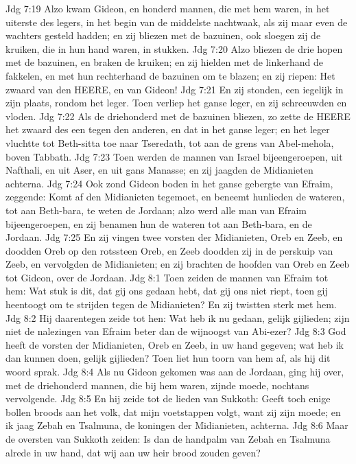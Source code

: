 Jdg 7:19  Alzo kwam Gideon, en honderd mannen, die met hem waren, in het uiterste des legers, in het begin van de middelste nachtwaak, als zij maar even de wachters gesteld hadden; en zij bliezen met de bazuinen, ook sloegen zij de kruiken, die in hun hand waren, in stukken.
Jdg 7:20  Alzo bliezen de drie hopen met de bazuinen, en braken de kruiken; en zij hielden met de linkerhand de fakkelen, en met hun rechterhand de bazuinen om te blazen; en zij riepen: Het zwaard van den HEERE, en van Gideon!
Jdg 7:21  En zij stonden, een iegelijk in zijn plaats, rondom het leger. Toen verliep het ganse leger, en zij schreeuwden en vloden.
Jdg 7:22  Als de driehonderd met de bazuinen bliezen, zo zette de HEERE het zwaard des een tegen den anderen, en dat in het ganse leger; en het leger vluchtte tot Beth-sitta toe naar Tseredath, tot aan de grens van Abel-mehola, boven Tabbath.
Jdg 7:23  Toen werden de mannen van Israel bijeengeroepen, uit Nafthali, en uit Aser, en uit gans Manasse; en zij jaagden de Midianieten achterna.
Jdg 7:24  Ook zond Gideon boden in het ganse gebergte van Efraim, zeggende: Komt af den Midianieten tegemoet, en beneemt hunlieden de wateren, tot aan Beth-bara, te weten de Jordaan; alzo werd alle man van Efraim bijeengeroepen, en zij benamen hun de wateren tot aan Beth-bara, en de Jordaan.
Jdg 7:25  En zij vingen twee vorsten der Midianieten, Oreb en Zeeb, en doodden Oreb op den rotssteen Oreb, en Zeeb doodden zij in de perskuip van Zeeb, en vervolgden de Midianieten; en zij brachten de hoofden van Oreb en Zeeb tot Gideon, over de Jordaan.
Jdg 8:1  Toen zeiden de mannen van Efraim tot hem: Wat stuk is dit, dat gij ons gedaan hebt, dat gij ons niet riept, toen gij heentoogt om te strijden tegen de Midianieten? En zij twistten sterk met hem.
Jdg 8:2  Hij daarentegen zeide tot hen: Wat heb ik nu gedaan, gelijk gijlieden; zijn niet de nalezingen van Efraim beter dan de wijnoogst van Abi-ezer?
Jdg 8:3  God heeft de vorsten der Midianieten, Oreb en Zeeb, in uw hand gegeven; wat heb ik dan kunnen doen, gelijk gijlieden? Toen liet hun toorn van hem af, als hij dit woord sprak.
Jdg 8:4  Als nu Gideon gekomen was aan de Jordaan, ging hij over, met de driehonderd mannen, die bij hem waren, zijnde moede, nochtans vervolgende.
Jdg 8:5  En hij zeide tot de lieden van Sukkoth: Geeft toch enige bollen broods aan het volk, dat mijn voetstappen volgt, want zij zijn moede; en ik jaag Zebah en Tsalmuna, de koningen der Midianieten, achterna.
Jdg 8:6  Maar de oversten van Sukkoth zeiden: Is dan de handpalm van Zebah en Tsalmuna alrede in uw hand, dat wij aan uw heir brood zouden geven?
